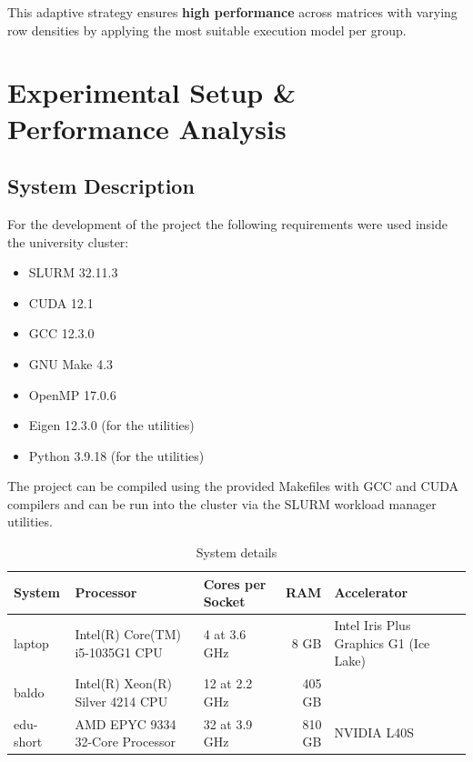 \documentclass[conference]{IEEEtran}
\begin{document}
    This adaptive strategy ensures \textbf{high performance} across matrices
    with varying row densities by applying the most suitable execution model
    per group. 

    \section{Experimental Setup \& Performance Analysis}
        \subsection{System Description}

        For the development of the project the following requirements were used
        inside the university cluster:
        \begin{itemize}
            \item SLURM 32.11.3
            \item CUDA 12.1
            \item GCC 12.3.0
            \item GNU Make 4.3
            \item OpenMP 17.0.6
            \item Eigen 12.3.0 (for the utilities)
            \item Python 3.9.18 (for the utilities) 
        \end{itemize}

        The project can be compiled using the provided Makefiles with GCC and
        CUDA compilers and can be run into the cluster via the SLURM workload
        manager utilities.

        \begin{table}[ht]
            \caption{System details}
            \label{tab:system_description}
            \centering
            \begin{adjustbox}{width=\columnwidth}
            \begin{tabular}{lllrl}
            \toprule
            \textbf{System} &  \textbf{Processor} & \textbf{Cores per Socket} & \textbf{RAM} & \textbf{Accelerator} \\
            \midrule
                laptop & Intel(R) Core(TM) i5-1035G1 CPU & 4 at 3.6 GHz & 8 GB & Intel Iris Plus Graphics G1 (Ice Lake) \\
                baldo & Intel(R) Xeon(R) Silver 4214 CPU & 12 at 2.2 GHz & 405 GB & \\
                edu-short & AMD EPYC 9334 32-Core Processor & 32 at 3.9 GHz & 810 GB & NVIDIA L40S \\
            \bottomrule
            \end{tabular}
            \end{adjustbox}
        \end{table}
\end{document}
